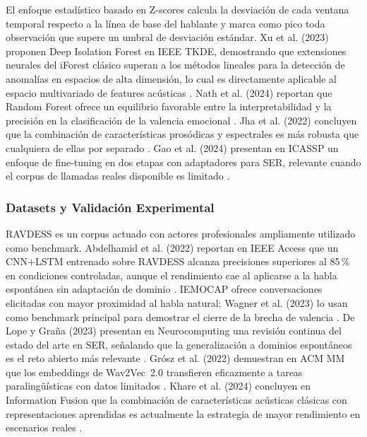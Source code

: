 El enfoque estadístico basado en Z-scores calcula la desviación de cada ventana
temporal respecto a la línea de base del hablante y marca como pico toda observación
que supere un umbral de desviación estándar. Xu et al. (2023) proponen Deep Isolation
Forest en IEEE TKDE, demostrando que extensiones neurales del iForest clásico superan
a los métodos lineales para la detección de anomalías en espacios de alta dimensión,
lo cual es directamente aplicable al espacio multivariado de features acústicas
\cite{xu2023}. Nath et al. (2024) reportan que Random Forest ofrece un equilibrio
favorable entre la interpretabilidad y la precisión en la clasificación de la valencia
emocional \cite{nath2024}. Jha et al. (2022) concluyen que la combinación de
características prosódicas y espectrales es más robusta que cualquiera de ellas por
separado \cite{jha2022}. Gao et al. (2024) presentan en ICASSP un enfoque de
fine-tuning en dos etapas con adaptadores para SER, relevante cuando el corpus de
llamadas reales disponible es limitado \cite{gao2024}.

\subsubsection{Datasets y Validación Experimental}

RAVDESS es un corpus actuado con actores profesionales ampliamente utilizado como
benchmark. Abdelhamid et al. (2022) reportan en IEEE Access que un CNN+LSTM entrenado
sobre RAVDESS alcanza precisiones superiores al 85\,\% en condiciones controladas,
aunque el rendimiento cae al aplicarse a la habla espontánea sin adaptación de dominio
\cite{abdelhamid2022}. IEMOCAP ofrece conversaciones elicitadas con mayor proximidad
al habla natural; Wagner et al. (2023) lo usan como benchmark principal para demostrar
el cierre de la brecha de valencia \cite{wagner2023}. De Lope y Graña (2023) presentan
en Neurocomputing una revisión continua del estado del arte en SER, señalando que la
generalización a dominios espontáneos es el reto abierto más relevante \cite{delope2023}.
Grósz et al. (2022) demuestran en ACM MM que los embeddings de Wav2Vec~2.0 transfieren
eficazmente a tareas paralingüísticas con datos limitados \cite{grosz2022}. Khare et
al. (2024) concluyen en Information Fusion que la combinación de características
acústicas clásicas con representaciones aprendidas es actualmente la estrategia de
mayor rendimiento en escenarios reales \cite{khare2024}.
